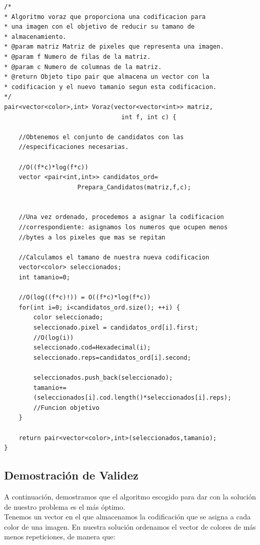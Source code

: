 \documentclass[a4paper,12pt,twoside]{article} %
\begin{document}
\begin{lstlisting}
/*
* Algoritmo voraz que proporciona una codificacion para 
* una imagen con el objetivo de reducir su tamano de 
* almacenamiento.
* @param matriz Matriz de pixeles que representa una imagen.
* @param f Numero de filas de la matriz.
* @param c Numero de columnas de la matriz.
* @return Objeto tipo pair que almacena un vector con la 
* codificacion y el nuevo tamanio segun esta codificacion.
*/
pair<vector<color>,int> Voraz(vector<vector<int>> matriz,
                                int f, int c) {

    //Obtenemos el conjunto de candidatos con las 
    //especificaciones necesarias.
    
    //O((f*c)*log(f*c))
    vector <pair<int,int>> candidatos_ord= 
                    Prepara_Candidatos(matriz,f,c);
    

    //Una vez ordenado, procedemos a asignar la codificacion 
    //correspondiente: asignamos los numeros que ocupen menos
    //bytes a los pixeles que mas se repitan

    //Calculamos el tamano de nuestra nueva codificacion
    vector<color> seleccionados;
    int tamanio=0;

    //O(log((f*c)!)) = O((f*c)*log(f*c))
    for(int i=0; i<candidatos_ord.size(); ++i) {
        color seleccionado;
        seleccionado.pixel = candidatos_ord[i].first;
        //O(log(i))
        seleccionado.cod=Hexadecimal(i); 
        seleccionado.reps=candidatos_ord[i].second;

        seleccionados.push_back(seleccionado);
        tamanio+=
        (seleccionados[i].cod.length()*seleccionados[i].reps);
        //Funcion objetivo
    }

    return pair<vector<color>,int>(seleccionados,tamanio);
}
\end{lstlisting}
\vspace{1cm}

\subsection{Demostración de Validez}

A continuación, demostramos que el algoritmo escogido para dar con la solución de nuestro problema es el más óptimo.\\

Tenemos un vector en el que almacenamos la codificación que se asigna a cada color de una imagen. En nuestra solución ordenamos el vector de colores de más menos repeticiones, de manera que:\\
\end{document}
